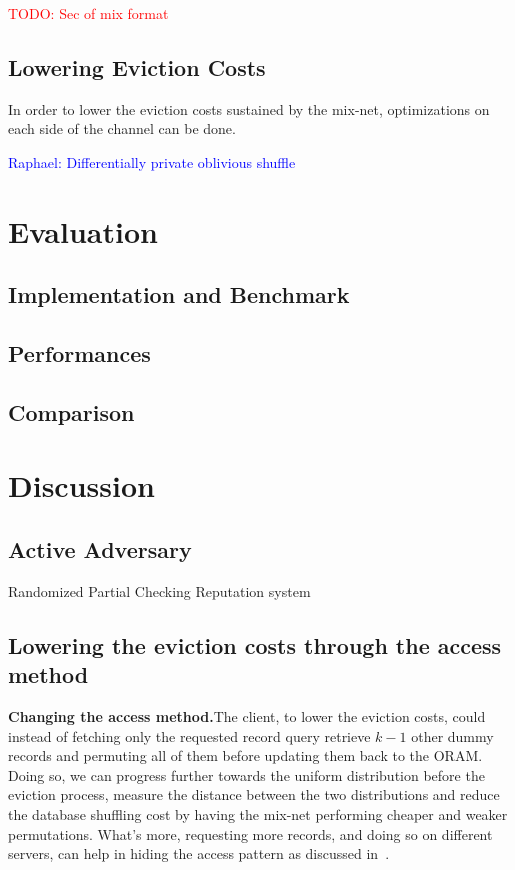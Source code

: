 \documentclass{llncs}
\newcommand{\raphael}[1]{\textcolor{blue}{Raphael: #1}}
\newcommand{\todo}[1]{\textcolor{red}{TODO: #1}}
\begin{document}
\todo{Sec of mix format}


\subsection{Lowering Eviction Costs}

In order to lower the eviction costs sustained by the mix-net, optimizations on each side of the channel can be done.

\raphael{Differentially private oblivious shuffle}

\section{Evaluation}
\subsection{Implementation and Benchmark}
\subsection{Performances}
\subsection{Comparison}

\section{Discussion}
\label{Discussion}

\subsection{Active Adversary}
Randomized Partial Checking
Reputation system

\subsection{Lowering the eviction costs through the access method}

\noindent\textbf{Changing the access method.}The client, to lower the eviction costs, could instead of fetching only the requested record query retrieve $k-1$ other dummy records and permuting all of them before updating them back to the ORAM.
Doing so, we can progress further towards the uniform distribution before the eviction process, measure the distance between the two distributions and reduce the database shuffling cost by having the mix-net performing cheaper and weaker permutations.
What's more, requesting more records, and doing so on different servers, can help in hiding the access pattern as discussed in~\cite{toledo2016lower}.\\
\end{document}
